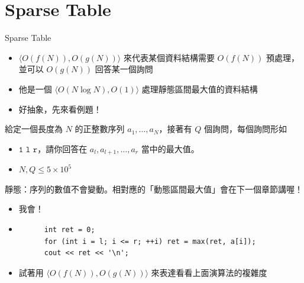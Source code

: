 \documentclass[standalone]{beamer}
\begin{document}
\section{Sparse Table}

\begin{frame}{Sparse Table}
  \begin{itemize}
    \item \(\langle {O}(f(N)), {O}(g(N))\rangle\) 來代表某個資料結構需要 \({O}(f(N))\) 預處理，並可以 \({O}(g(N))\) 回答某一個詢問
    \item 他是一個 \(\langle {O}(N \log N), {O}(1)\rangle\) 處理靜態區間最大值的資料結構
    \item 好抽象，先來看例題！
  \end{itemize}
\end{frame}

\begin{frame}{}
  \begin{problem}
    給定一個長度為 \(N\) 的正整數序列 \(a_1, \dots, a_N\)，接著有 \(Q\) 個詢問，每個詢問形如
    \begin{itemize}
        \item
            \(\texttt{1 l r}\)，請你回答在 \(a_l, a_{l+1}, \dots, a_{r}\) 當中的最大值。
    \end{itemize}
    
    \begin{itemize}
        \item
            \(N, Q \leq 5 \times 10^5\)
    \end{itemize}
  \end{problem}

  靜態：序列的數值不會變動。相對應的「動態區間最大值」會在下一個章節講喔！
\end{frame}

\begin{frame}[fragile]{}
  \begin{itemize}
    \item 我會！
    \item 
    \begin{verbatim}
      int ret = 0;
      for (int i = l; i <= r; ++i) ret = max(ret, a[i]);
      cout << ret << '\n';
    \end{verbatim}
    \item 試著用 \(\langle {O}(f(N)), {O}(g(N))\rangle\) 來表達看看上面演算法的複雜度
  \end{itemize}
\end{frame}
\end{document}
